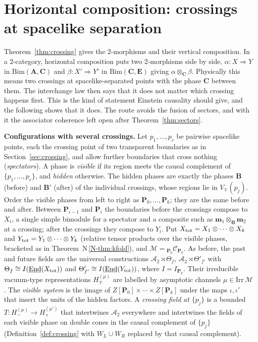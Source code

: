\documentclass[11pt]{article}
\theoremstyle{definition}
\theoremstyle{remark}
\newcommand{\cA}{\mathcal A}
\newcommand{\bfB}{\mathbf B}
\newcommand{\bfA}{\mathbf A}
\newcommand{\bfC}{\mathbf C}
\newcommand{\bfE}{\mathbf E}
\newcommand{\nref}[1]{N\,\ref{N-#1}}
\begin{document}
\section{Horizontal composition: crossings at spacelike separation}\label{sec:horizontal}
Theorem~\ref{thm:crossing} gives the 2-morphisms and their vertical composition. In a 2-category, horizontal composition puts two 2-morphisms side by side, $\alpha\colon X\Rightarrow Y$ in $\mathrm{Bim}(\bfA,\bfC)$ and $\beta\colon X'\Rightarrow Y'$ in $\mathrm{Bim}(\bfC,\bfE)$ giving $\alpha\otimes_{\bfC}\beta$. Physically this means two crossings at spacelike-separated points with the phase $\bfC$ between them. The interchange law then says that it does not matter which crossing happens first. This is the kind of statement Einstein causality should give, and the following shows that it does. The route avoids the fusion of sectors, and with it the associator coherence left open after Theorem~\ref{thm:sectors}.

\textbf{Configurations with several crossings.} Let $p_1,\dots,p_r$ be pairwise spacelike points, each the crossing point of two transparent boundaries as in Section~\ref{sec:crossing}, and allow further boundaries that cross nothing (\emph{spectators}). A phase is \emph{visible} if its region meets the causal complement of $\{p_1,\dots,p_r\}$, and \emph{hidden} otherwise. The hidden phases are exactly the phases $\bfB$ (before) and $\bfB'$ (after) of the individual crossings, whose regions lie in $V_\mp(p_j)$. Order the visible phases from left to right as $\mathbf P_0,\dots,\mathbf P_k$; they are the same before and after. Between $\mathbf P_{i-1}$ and $\mathbf P_i$ the boundaries before the crossings compose to $X_i$, a single simple bimodule for a spectator and a composite such as $\mathbf m_1\otimes_{\bfB}\mathbf m_2$ at a crossing; after the crossings they compose to $Y_i$. Put $X_{\rm tot}=X_1\otimes\cdots\otimes X_k$ and $Y_{\rm tot}=Y_1\otimes\cdots\otimes Y_k$ (relative tensor products over the visible phases, bracketed as in Theorem~\nref{thm:kfold}), and $\mathcal M={}_{\mathbf P_0}\mathcal C_{\mathbf P_k}$. As before, the past and future fields are the universal constructions $\cA_2\rtimes\Theta_f$, $\cA_2\rtimes\Theta'_{f'}$ with $\Theta_f\cong I(\underline{\mathrm{End}}(X_{\rm tot}))$ and $\Theta'_{f'}\cong I(\underline{\mathrm{End}}(Y_{\rm tot}))$, where $I=I_{\mathbf P_k}$. Their irreducible vacuum-type representations $H_\mp^{(\mu)}$ are labelled by asymptotic channels $\mu\in\mathrm{Irr}\,\mathcal M$. The \emph{visible system} is the image of $Z[\mathbf P_0]\times\cdots\times Z[\mathbf P_k]$ under the maps $\iota,\iota'$ that insert the units of the hidden factors. A \emph{crossing field at $\{p_j\}$} is a bounded $T\colon H_-^{(\mu)}\to H_+^{(\mu')}$ that intertwines $\cA_2$ everywhere and intertwines the fields of each visible phase on double cones in the causal complement of $\{p_j\}$ (Definition~\ref{def:crossing} with $W_L\cup W_R$ replaced by that causal complement).
\end{document}
